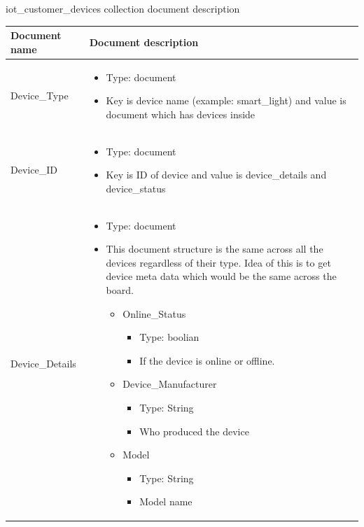 iot{\_}customer{\_}devices collection document description
\begin{center}
\begin{longtable}{ |m{4cm}|m{9cm}| } 
 \hline
 Document name & Document description \\ 
 \hline
  Device{\_}Type &   
  \begin{itemize}
    \item Type: document
    \item Key is device name (example: smart{\_}light) and value is document which has devices inside
  \end{itemize} \\
 \hline
   Device{\_}ID &   
  \begin{itemize}
    \item Type: document
    \item Key is ID of device and value is device{\_}details and device{\_}status
  \end{itemize} \\
 \hline
   Device{\_}Details &   
  \begin{itemize}
    \item Type: document
    \item This document structure is the same across all the devices regardless of their type. Idea of this is to get device meta data which would be the same across the board.
    \begin{itemize}
        \item Online{\_}Status
        \begin{itemize}
            \item Type: boolian
            \item If the device is online or offline.
        \end{itemize}
        
        \item Device{\_}Manufacturer
        \begin{itemize}
            \item Type: String
            \item Who produced the device
        \end{itemize}
        
        \item Model
        \begin{itemize}
            \item Type: String
            \item Model name
        \end{itemize}
        

\end{itemize}
\end{itemize}
\end{longtable}
\end{center}
